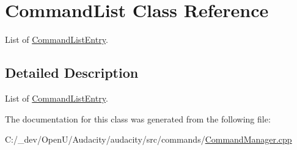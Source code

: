 \hypertarget{class_command_list}{}\section{Command\+List Class Reference}
\label{class_command_list}


List of \hyperlink{struct_command_list_entry}{Command\+List\+Entry}.  




\subsection{Detailed Description}
List of \hyperlink{struct_command_list_entry}{Command\+List\+Entry}. 

The documentation for this class was generated from the following file\+:\begin{DoxyCompactItemize}
\item 
C\+:/\+\_\+dev/\+Open\+U/\+Audacity/audacity/src/commands/\hyperlink{_command_manager_8cpp}{Command\+Manager.\+cpp}\end{DoxyCompactItemize}
